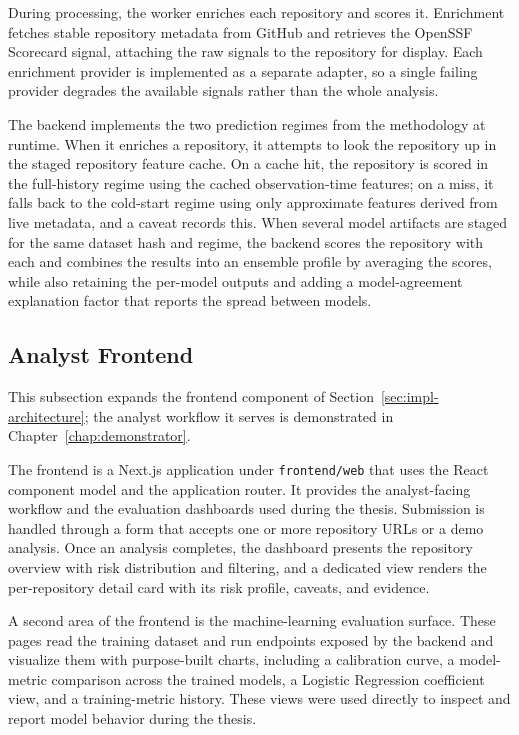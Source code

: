 During processing, the worker enriches each repository and scores it. Enrichment fetches stable repository metadata from GitHub and retrieves the OpenSSF Scorecard signal, attaching the raw signals to the repository for display. Each enrichment provider is implemented as a separate adapter, so a single failing provider degrades the available signals rather than the whole analysis.

The backend implements the two prediction regimes from the methodology at runtime. When it enriches a repository, it attempts to look the repository up in the staged repository feature cache. On a cache hit, the repository is scored in the full-history regime using the cached observation-time features; on a miss, it falls back to the cold-start regime using only approximate features derived from live metadata, and a caveat records this. When several model artifacts are staged for the same dataset hash and regime, the backend scores the repository with each and combines the results into an ensemble profile by averaging the scores, while also retaining the per-model outputs and adding a model-agreement explanation factor that reports the spread between models.

\subsection{Analyst Frontend}
\label{sec:impl-frontend}

This subsection expands the frontend component of Section~\ref{sec:impl-architecture}; the analyst workflow it serves is demonstrated in Chapter~\ref{chap:demonstrator}.

The frontend is a Next.js application under \texttt{frontend/web} that uses the React component model and the application router. It provides the analyst-facing workflow and the evaluation dashboards used during the thesis. Submission is handled through a form that accepts one or more repository URLs or a demo analysis. Once an analysis completes, the dashboard presents the repository overview with risk distribution and filtering, and a dedicated view renders the per-repository detail card with its risk profile, caveats, and evidence.

A second area of the frontend is the machine-learning evaluation surface. These pages read the training dataset and run endpoints exposed by the backend and visualize them with purpose-built charts, including a calibration curve, a model-metric comparison across the trained models, a Logistic Regression coefficient view, and a training-metric history. These views were used directly to inspect and report model behavior during the thesis.

